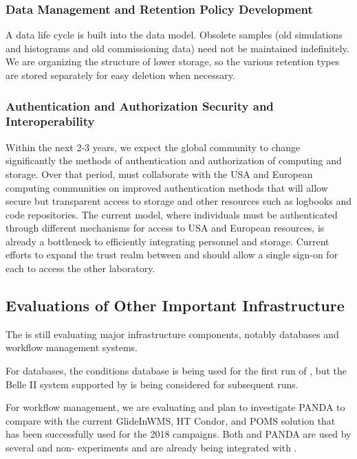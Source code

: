 \subsubsection{Data Management and Retention Policy Development}



A data life cycle is built into the  data model.  Obsolete samples (old simulations and histograms and old commissioning data) need not be maintained indefinitely.  
We are organizing the structure of lower storage, so the various retention types are stored separately for easy deletion when necessary.  

\subsubsection{Authentication and Authorization Security and Interoperability}\label{ch-comp-auth}

Within the next 2-3 years, we expect the global  community to change significantly the methods of authentication and authorization of computing and storage. 
Over that period,  must collaborate with the USA and European  computing communities on improved authentication methods  that will allow secure but transparent access to storage and other resources such as logbooks and code repositories.  The current model, where individuals must be authenticated through different mechanisms for access to USA and European resources, is already a bottleneck to efficiently integrating personnel and storage. 
Current efforts to expand the trust realm between  and  should allow a single sign-on for each to access the other laboratory.


\subsection{Evaluations of Other Important Infrastructure}

The   is still evaluating major infrastructure components, notably databases and workflow management systems.

For databases\cite{Laycock:2019ynk}, the  conditions database is being used for the first run of , but the Belle II\cite{Ritter:2018jxh} system supported by  is being considered for subsequent runs. 

For workflow management, we are evaluating \cite{Falabella:2016waj} and plan to investigate PANDA\cite{Megino:2017ywl} to compare with the current GlideInWMS, HT Condor, and POMS solution that has been successfully used for the 2018  campaigns.
Both  and PANDA are used by several  and non- experiments and are already being integrated with . 
